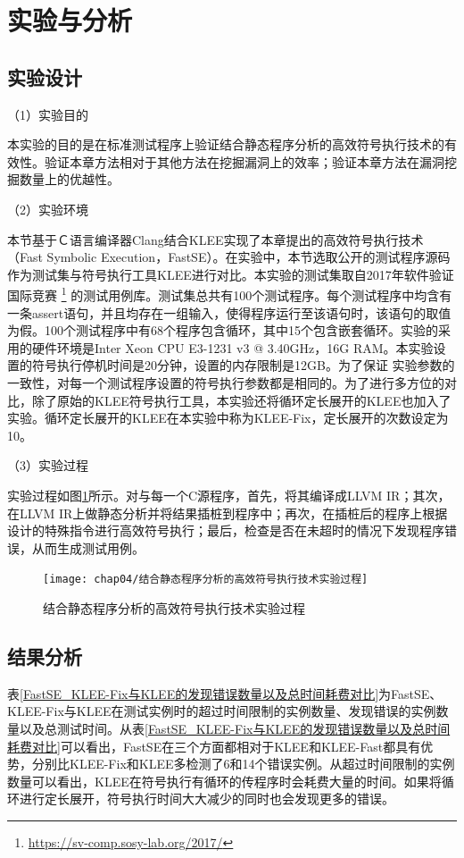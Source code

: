 \section{实验与分析}
\label{sec-experiment}

\subsection{实验设计}

（1）实验目的

本实验的目的是在标准测试程序上验证结合静态程序分析的高效符号执行技术的有效性。验证本章方法相对于其他方法在挖掘漏洞上的效率；验证本章方法在漏洞挖掘数量上的优越性。

（2）实验环境

本节基于Ｃ语言编译器Clang结合KLEE实现了本章提出的高效符号执行技术（Fast Symbolic Execution，FastSE）。在实验中，本节选取公开的测试程序源码作为测试集与符号执行工具KLEE进行对比。本实验的测试集取自2017年软件验证国际竞赛
\footnote{\url{https://sv-comp.sosy-lab.org/2017/}}
的测试用例库。测试集总共有100个测试程序。每个测试程序中均含有一条assert语句，并且均存在一组输入，使得程序运行至该语句时，该语句的取值为假。100个测试程序中有68个程序包含循环，其中15个包含嵌套循环。实验的采用的硬件环境是Inter Xeon CPU E3-1231 v3 @ 3.40GHz，16G RAM。本实验设置的符号执行停机时间是20分钟，设置的内存限制是12GB。为了保证
实验参数的一致性，对每一个测试程序设置的符号执行参数都是相同的。为了进行多方位的对比，除了原始的KLEE符号执行工具，本实验还将循环定长展开的KLEE也加入了实验。循环定长展开的KLEE在本实验中称为KLEE-Fix，定长展开的次数设定为10。

（3）实验过程

实验过程如图\ref{experiment_procedure}所示。对与每一个C源程序，首先，将其编译成LLVM IR；其次，在LLVM IR上做静态分析并将结果插桩到程序中；再次，在插桩后的程序上根据设计的特殊指令进行高效符号执行；最后，检查是否在未超时的情况下发现程序错误，从而生成测试用例。

\begin{figure}[h]
	\centering
	\texttt{[image: chap04/结合静态程序分析的高效符号执行技术实验过程]}
	\caption{结合静态程序分析的高效符号执行技术实验过程}
	\label{experiment_procedure}
\end{figure}

\subsection{结果分析}
表\ref{FastSE_KLEE-Fix与KLEE的发现错误数量以及总时间耗费对比}为FastSE、KLEE-Fix与KLEE在测试实例时的超过时间限制的实例数量、发现错误的实例数量以及总测试时间。从表\ref{FastSE_KLEE-Fix与KLEE的发现错误数量以及总时间耗费对比}可以看出，FastSE在三个方面都相对于KLEE和KLEE-Fast都具有优势，分别比KLEE-Fix和KLEE多检测了6和14个错误实例。从超过时间限制的实例数量可以看出，KLEE在符号执行有循环的传程序时会耗费大量的时间。如果将循环进行定长展开，符号执行时间大大减少的同时也会发现更多的错误。

